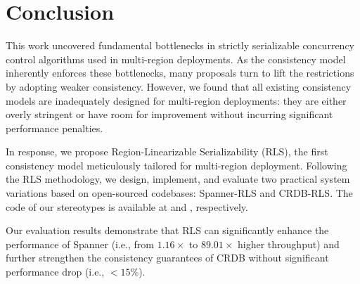 \vspace{10pt}
\section{Conclusion}\label{sec:conclusion}
This work uncovered fundamental bottlenecks in strictly serializable concurrency control algorithms used in multi-region deployments. As the consistency model inherently enforces these bottlenecks, many proposals turn to lift the restrictions by adopting weaker consistency. However, we found that all existing consistency models are inadequately designed for multi-region deployments: they are either overly stringent or have room for improvement without incurring significant performance penalties. 

In response, we propose Region-Linearizable Serializability (RLS), the first consistency model meticulously tailored for multi-region deployment. Following the RLS methodology, we design, implement, and evaluate two practical system variations based on open-sourced codebases: Spanner-RLS and CRDB-RLS. The code of our stereotypes is available at {} and {}, respectively. 

Our evaluation results demonstrate that RLS can significantly enhance the performance of Spanner (i.e., from $1.16\times$ to $89.01\times$ higher throughput) and further strengthen the consistency guarantees of CRDB without significant performance drop (i.e.,  $<15\%$). 

\clearpage